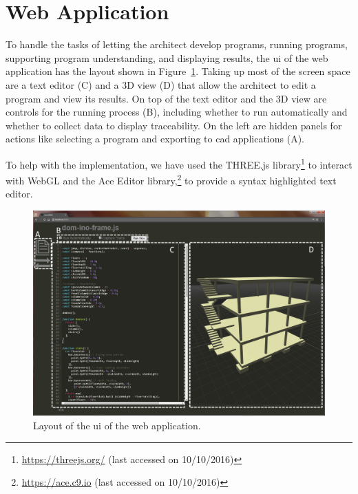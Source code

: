 \section{Web Application}
\label{sec:sol:page}
To handle the tasks of letting the architect develop programs, running programs, supporting program understanding, and displaying results, the \gls{ui} of the web application has the layout shown in Figure~\ref{fig:page:view}.
Taking up most of the screen space are a text editor (C) and a 3D view (D) that allow the architect to edit a program and view its results.
On top of the text editor and the 3D view are controls for the running process (B), including whether to run automatically and whether to collect data to display traceability.
On the left are hidden panels for actions like selecting a program and exporting to \gls{cad} applications (A).

To help with the implementation, we have used the THREE.js library\footnote{\url{https://threejs.org/} (last accessed on 10/10/2016)} to interact with WebGL\cite{marrin2011webgl} and the Ace Editor library,\footnote{\url{https://ace.c9.io} (last accessed on 10/10/2016)} to provide a syntax highlighted text editor.


\begin{figure}
  \centering
  \includegraphics[width=1.0\textwidth]{./images/webpage_view/webpage_view}
  \caption{Layout of the \gls{ui} of the web application.}
  \label{fig:page:view}
\end{figure}


